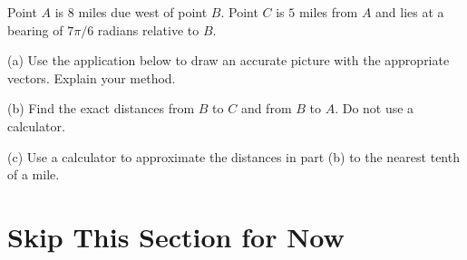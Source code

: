 \documentclass{ximera}
\begin{document}
\begin{question}  \label{Qdf45g5t653}
Point $A$ is $8$ miles due west of point $B$. Point $C$ is $5$ miles from $A$ and lies at a bearing of $7\pi/6$ radians relative to $B$.

(a) Use the application below to draw an accurate picture with the appropriate vectors. Explain your method.

(b) Find the exact distances from $B$ to $C$ and from $B$ to $A$. Do not use a calculator.

(c) Use a calculator to approximate the distances in part (b) to the nearest tenth of a mile.

 
\begin{onlineOnly}
    \begin{center}
\end{center}
\end{onlineOnly}
\end{question}






\section{Skip This Section for Now}
\end{document}
